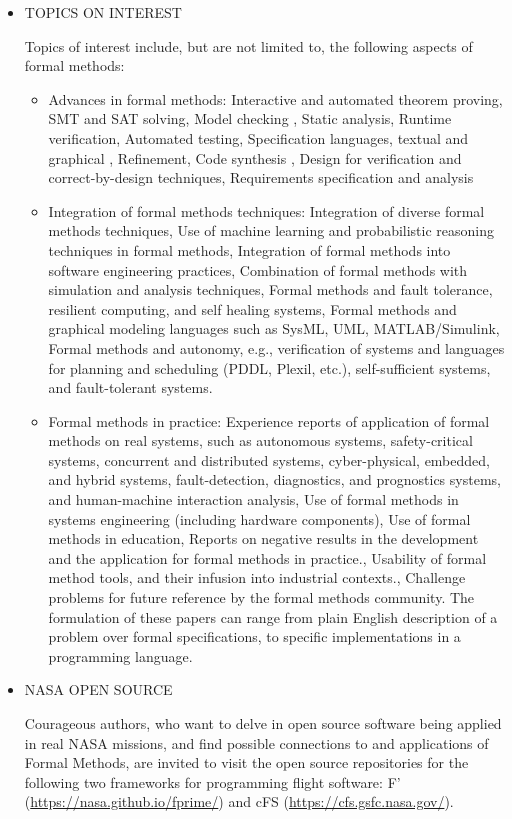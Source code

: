\documentclass[prodmode,acmtecs]{acmsmall} %
\begin{document}
\begin{itemize}
\item  TOPICS ON INTEREST 
 
  Topics of interest include, but are not limited to, the following aspects of formal methods: 
 
\begin{itemize}\item  Advances in formal methods: Interactive and automated theorem proving, SMT and SAT solving, Model checking , Static analysis, Runtime verification, Automated testing, Specification languages, textual and graphical , Refinement, Code synthesis , Design for verification and correct-by-design techniques, Requirements specification and analysis
\item  Integration of formal methods techniques: Integration of diverse formal methods techniques, Use of machine learning and probabilistic reasoning techniques in formal methods, Integration of formal methods into software engineering practices, Combination of formal methods with simulation and analysis techniques, Formal methods and fault tolerance, resilient computing, and self healing systems, Formal methods and graphical modeling languages such as SysML, UML, MATLAB/Simulink, Formal methods and autonomy, e.g., verification of systems and languages for planning and scheduling (PDDL, Plexil, etc.), self-sufficient systems, and fault-tolerant systems.
\item  Formal methods in practice: Experience reports of application of formal methods on real systems, such as autonomous systems, safety-critical systems, concurrent and distributed systems, cyber-physical, embedded, and hybrid systems, fault-detection, diagnostics, and prognostics systems, and human-machine interaction analysis, Use of formal methods in systems engineering (including hardware components), Use of formal methods in education, Reports on negative results in the development and the application for formal methods in practice., Usability of formal method tools, and their infusion into industrial contexts., Challenge problems for future reference by the formal methods community. The formulation of these papers can range from plain English description of a problem over formal specifications, to specific implementations in a programming language.
\end{itemize} 
\item  NASA OPEN SOURCE  
 
  Courageous authors, who want to delve in open source software being applied in real NASA missions, and find possible connections to and applications of Formal Methods, are invited to visit the open source repositories for the following two frameworks for programming flight software: F’ (\href{https://nasa.github.io/fprime/}{https://nasa.github.io/fprime/}) and cFS (\href{https://cfs.gsfc.nasa.gov/}{https://cfs.gsfc.nasa.gov/}). 
 

\end{itemize}
\end{document}
